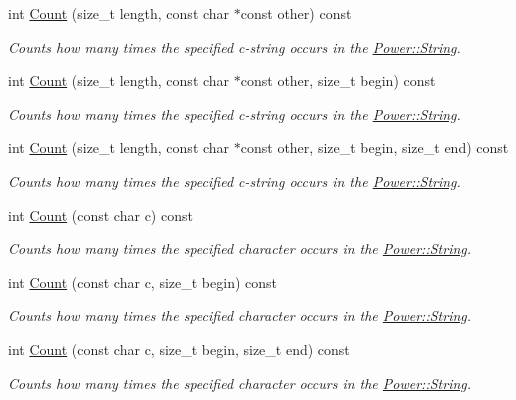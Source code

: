 \begin{DoxyCompactItemize}
int \hyperlink{class_power_1_1_string_af5bacafb26ee473157898f3422f8c24a}{Count} (size\+\_\+t length, const char $\ast$const other) const
\begin{DoxyCompactList}\small\item\em Counts how many times the specified c-\/string occurs in the \hyperlink{class_power_1_1_string}{Power\+::\+String}. \end{DoxyCompactList}\item 
int \hyperlink{class_power_1_1_string_a03ad8ce778f9af4a18257082ef20e8c8}{Count} (size\+\_\+t length, const char $\ast$const other, size\+\_\+t begin) const
\begin{DoxyCompactList}\small\item\em Counts how many times the specified c-\/string occurs in the \hyperlink{class_power_1_1_string}{Power\+::\+String}. \end{DoxyCompactList}\item 
int \hyperlink{class_power_1_1_string_a60f1505d3d34503c5f0f74730eb4c8fb}{Count} (size\+\_\+t length, const char $\ast$const other, size\+\_\+t begin, size\+\_\+t end) const
\begin{DoxyCompactList}\small\item\em Counts how many times the specified c-\/string occurs in the \hyperlink{class_power_1_1_string}{Power\+::\+String}. \end{DoxyCompactList}\item 
int \hyperlink{class_power_1_1_string_a55085e218917bb734a53c150cb7b9d1e}{Count} (const char c) const
\begin{DoxyCompactList}\small\item\em Counts how many times the specified character occurs in the \hyperlink{class_power_1_1_string}{Power\+::\+String}. \end{DoxyCompactList}\item 
int \hyperlink{class_power_1_1_string_a235d184d97368dcffa1cbe0a085c0382}{Count} (const char c, size\+\_\+t begin) const
\begin{DoxyCompactList}\small\item\em Counts how many times the specified character occurs in the \hyperlink{class_power_1_1_string}{Power\+::\+String}. \end{DoxyCompactList}\item 
int \hyperlink{class_power_1_1_string_a973ec141cb308e2a6cb309b36f978c6b}{Count} (const char c, size\+\_\+t begin, size\+\_\+t end) const
\begin{DoxyCompactList}\small\item\em Counts how many times the specified character occurs in the \hyperlink{class_power_1_1_string}{Power\+::\+String}. \end{DoxyCompactList}\item 

\end{DoxyCompactItemize}
